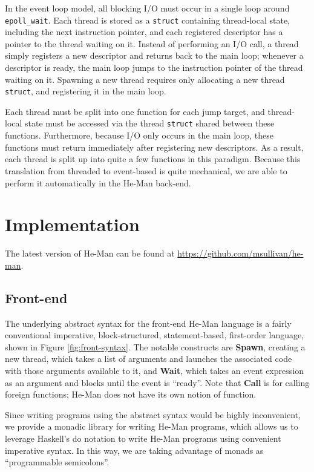 \documentclass[preprint,10pt]{sigplanconf}
\renewcommand{\t}{\texttt}
\renewcommand{\b}{\textbf}
\begin{document}
In the event loop model, all blocking I/O must occur in a single loop around
\t{epoll\_wait}. Each thread is stored as a \t{struct} containing thread-local
state, including the next instruction pointer, and each registered descriptor
has a pointer to the thread waiting on it. Instead of performing an I/O call, a
thread simply registers a new descriptor and returns back to the main loop;
whenever a descriptor is ready, the main loop jumps to the instruction pointer
of the thread waiting on it. Spawning a new thread requires only allocating a
new thread \t{struct}, and registering it in the main loop.

Each thread must be split into one function for each jump target, and
thread-local state must be accessed via the thread \t{struct} shared between
these functions. Furthermore, because I/O only occurs in the main loop, these
functions must return immediately after registering new descriptors. As a
result, each thread is split up into quite a few functions in this paradigm.
Because this translation from threaded to event-based is quite mechanical, we
are able to perform it automatically in the He-Man back-end.

\section{Implementation}

The latest version of He-Man can be found at
\url{https://github.com/msullivan/he-man}.

\subsection{Front-end}

The underlying abstract syntax for the front-end He-Man language is a
fairly conventional imperative, block-structured, statement-based,
first-order language, shown in Figure \ref{fig:front-syntax}. The
notable constructs are \b{Spawn}, creating a new thread, which takes a
list of arguments and launches the associated code with those
arguments available to it, and \b{Wait}, which takes an event
expression as an argument and blocks until the event is
``ready''. Note that \b{Call} is for calling foreign functions; He-Man
does not have its own notion of function.

Since writing programs using the abstract syntax would be highly
inconvenient, we provide a monadic library for writing He-Man
programs, which allows us to leverage Haskell's do notation to write
He-Man programs using convenient imperative syntax. In this way, we
are taking advantage of monads as ``programmable semicolons''.
\end{document}
